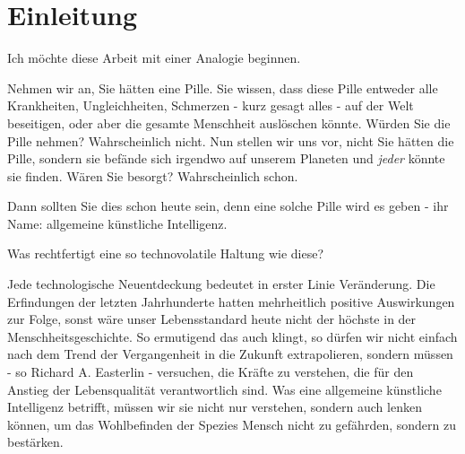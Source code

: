 \chapter{Einleitung}

Ich möchte diese Arbeit mit einer Analogie beginnen.

Nehmen wir an, Sie hätten eine Pille. Sie wissen, dass diese Pille entweder alle Krankheiten, Ungleichheiten, Schmerzen - kurz gesagt alles  - auf der Welt beseitigen, oder aber die gesamte Menschheit auslöschen könnte. Würden Sie die Pille nehmen? Wahrscheinlich nicht. Nun stellen wir uns vor, nicht Sie hätten die Pille, sondern sie befände sich irgendwo auf unserem Planeten und \emph{jeder} könnte sie finden. Wären Sie besorgt? Wahrscheinlich schon.

Dann sollten Sie dies schon heute sein, denn eine solche Pille wird es geben - ihr Name: allgemeine künstliche Intelligenz.

Was rechtfertigt eine so technovolatile Haltung wie diese?


Jede technologische Neuentdeckung bedeutet in erster Linie Veränderung. Die Erfindungen der letzten Jahrhunderte hatten mehrheitlich positive Auswirkungen zur Folge, sonst wäre unser Lebensstandard heute nicht der höchste in der Menschheitsgeschichte. So ermutigend das auch klingt, so dürfen wir nicht einfach nach dem Trend der Vergangenheit in die Zukunft extrapolieren, sondern müssen - so Richard A. Easterlin - versuchen, die Kräfte zu verstehen, die für den Anstieg der Lebensqualität verantwortlich sind.  Was eine allgemeine künstliche Intelligenz betrifft, müssen wir sie nicht nur verstehen, sondern auch lenken können, um das Wohlbefinden der Spezies Mensch nicht zu gefährden, sondern zu bestärken.

